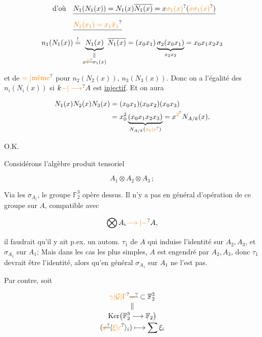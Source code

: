 \[
 \begin{aligned}
 \text{d'où}\quad &\deleted{N_1(N_1(x))=N_1(x)\overline{N_1(x)}=x\unsure{\sigma_1(x)}(\unsure{x\sigma_1(x)})}\\
 &\deleted{\unsure{N_1(x_1)=x_1\bar x_1}}\\
 n_1(N_1(x))&\overset{!}{=}\underset{\substack{\Vert\\x\deleted{\unsure{T}}\sigma_1(x)}}{\underbrace{N_1(x)}}\,\overline{N_1(x)}
 =(x_0x_1)\underbrace{\sigma_2(x_0x_1)}_{x_2x_3}=x_0x_1x_2x_3
 \end{aligned}
\]

et de $\unsure{=|\text{même}}$ pour $n_2(N_2(x))$, $n_3(N_3(x))$. Donc on a l'égalité des $n_i(N_i(x))$ si $k\unsure{\mathord{-}|\longrightarrow}A$ est \uline{injectif}. Et on aura

\[
 \begin{aligned}
 N_1(x)N_2(x)N_3(x)&=(x_0x_1)(x_0x_2)(x_0x_3)\\
 &=x_0^2\underbrace{(x_0x_1x_2x_3)}_{N_{A/k}(\unsure{x_0|x})}=x^{\unsure{2}}N_{A/k}(x),
 \end{aligned}
\]

O.K.


Considérons l'algèbre produit tensoriel 

\[
 A_1\otimes A_2\otimes A_3\,;
\]

Via les $\sigma_{A_i}$, le groupe $\mathbb F_2^3$ opère dessus. Il n'y a pas en général d'opération de ce groupe sur $A$, compatible avec

\[
 \bigotimes A_i\unsure{\longrightarrow|\mathord{-}}A,
\]

 il faudrait qu'il y ait p.ex. un autom. $\tau_1$ de $A$ qui induise  l'identité sur $A_2,A_3$, et $\sigma_{A_1}$ sur $A_1$; Mais dans les cas les plus simples, $A$ est engendré par $A_2,A_3$, donc $\tau_1$ devrait être l'identité, alors qu'en général $\sigma_{A_1}$ sur $A_1$ ne l'est pas.

Par contre, soit

\[
 \begin{gathered}
 \unsure{\gamma|\mathcal G|\Gamma}\deleted{\unsure{=}}\subset\mathbb F_2^3\\[-2pt]
 \Vert\\[-2pt]
 \operatorname{Ker}\bigl(\mathbb F_2^3\longrightarrow\mathbb F_2\bigr)\\[-2pt]
 (\deleted{\unsure{x}}\inserted{\unsure{\xi|\varepsilon}}_i)\longmapsto\sum\xi_i
 \end{gathered}
\]

